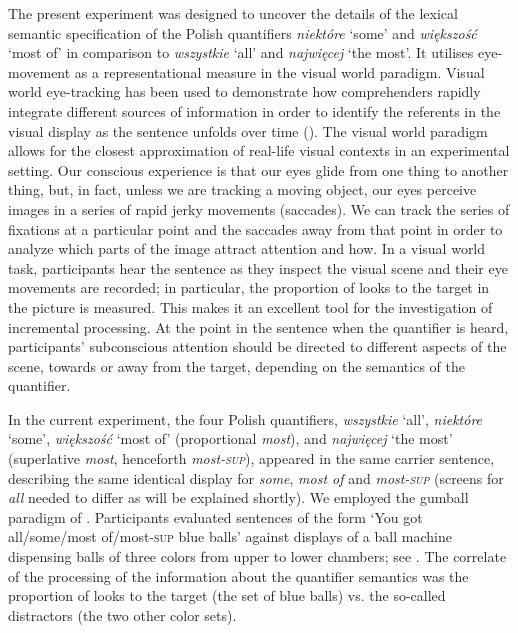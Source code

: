 \documentclass[output=paper]{langscibook}
\begin{document}
The present experiment was designed to uncover the details of the lexical semantic specification of the Polish
quantifiers \textit{niektóre} `some' and \textit{większość} `most of' in comparison to
\textit{wszystkie} `all' and \textit{najwięcej} `the most'. It utilises eye-movement as a
representational measure in the visual world paradigm. Visual world eye-tracking has been used to demonstrate how
comprehenders rapidly integrate different sources of information in order to identify the referents in the visual
display as the sentence unfolds over time (\citealt{tanenhaus1995integration, allopenna1998tracking}). The visual world
paradigm allows for the closest approximation of real-life visual contexts in an experimental setting. Our conscious
experience is that our eyes glide from one thing to another thing, but, in fact, unless we are tracking a moving object, our eyes
perceive images in a series of rapid jerky movements (saccades). We can track the series of fixations at a particular
point and the saccades away from that point in order to analyze which parts of the image attract attention and how. In
a visual world task, participants hear the sentence as they inspect the visual scene and their eye movements are
recorded; in particular, the proportion of looks to the target in the picture is measured. This makes it an excellent
tool for the investigation of incremental processing. At the point in the sentence when the quantifier is heard,
participants’ subconscious attention should be directed to different aspects of the scene, towards or away from the
target, depending on the semantics of the quantifier.

In the current experiment, the four Polish quantifiers, \textit{wszystkie} `all', \textit{niektóre} `some', \textit{większość} `most of' (proportional \textit{most}), and \textit{najwięcej} `the most' (superlative \textit{most}, henceforth \textit{most\textsc{-sup}}), appeared in the same carrier
sentence, describing the same identical display for \textit{some}, \textit{most of} and \textit{most\textsc{-sup}} (screens for \textit{all} needed to differ as will be explained shortly). We employed the gumball paradigm of \citet{degen2011making,degen2016availability}. Participants evaluated sentences of the form ‘You got all/some/most
of/most\textsc{-sup} blue balls’ against displays of a ball machine dispensing balls of three colors from upper to lower chambers; see . The correlate of the processing of the information about the quantifier semantics was the proportion of looks to the target (the set of blue balls) vs. the so-called distractors (the two other color sets).
\end{document}
